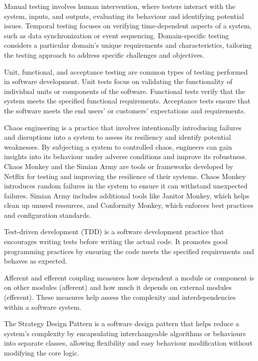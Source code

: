 \documentclass[main.tex]{subfiles}
\begin{document}
Manual testing involves human intervention, where testers interact with the system, inputs, and outputs, evaluating its behaviour and identifying potential issues. Temporal testing focuses on verifying time-dependent aspects of a system, such as data synchronization or event sequencing. Domain-specific testing considers a particular domain's unique requirements and characteristics, tailoring the testing approach to address specific challenges and objectives.

Unit, functional, and acceptance testing are common types of testing performed in software development. Unit tests focus on validating the functionality of individual units or components of the software. Functional tests verify that the system meets the specified functional requirements. Acceptance tests ensure that the software meets the end users' or customers' expectations and requirements.



Chaos engineering is a practice that involves intentionally introducing failures and disruptions into a system to assess its resiliency and identify potential weaknesses. By subjecting a system to controlled chaos, engineers can gain insights into its behaviour under adverse conditions and improve its robustness. Chaos Monkey and the Simian Army are tools or frameworks developed by Netflix for testing and improving the resilience of their systems. Chaos Monkey introduces random failures in the system to ensure it can withstand unexpected failures. Simian Army includes additional tools like Janitor Monkey, which helps clean up unused resources, and Conformity Monkey, which enforces best practices and configuration standards.

Test-driven development (TDD) is a software development practice that encourages writing tests before writing the actual code. It promotes good programming practices by ensuring the code meets the specified requirements and behaves as expected.

Afferent and efferent coupling measures how dependent a module or component is on other modules (afferent) and how much it depends on external modules (efferent). These measures help assess the complexity and interdependencies within a software system.



The Strategy Design Pattern is a software design pattern that helps reduce a system's complexity by encapsulating interchangeable algorithms or behaviours into separate classes, allowing flexibility and easy behaviour modification without modifying the core logic.
\end{document}
